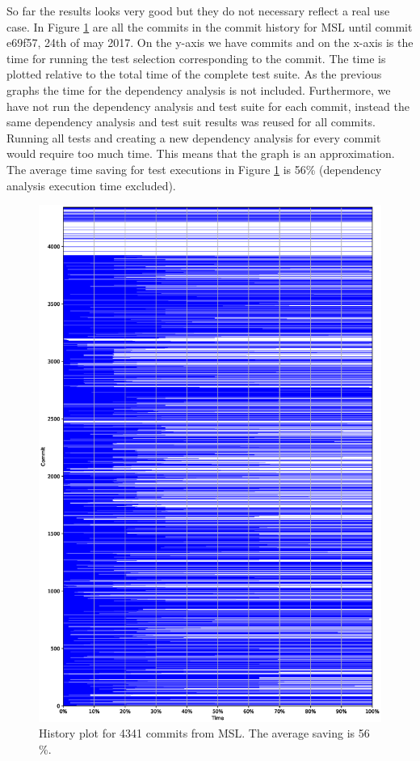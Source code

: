 \documentclass{cslthse-msc}
\begin{document}
So far the results looks very good but they do not necessary reflect a real use case. In Figure \ref{fig:mslhistory} are all the commits in the commit history for MSL until commit e69f57, 24th of may 2017. On the y-axis we have commits and on the x-axis is the time for running the test selection corresponding to the commit. The time is plotted relative to the total time of the complete test suite. As the previous graphs the time for the dependency analysis is not included. Furthermore, we have not run the dependency analysis and test suite for each commit, instead the same dependency analysis and test suit results was reused for all commits. Running all tests and creating a new dependency analysis for every commit would require too much time. This means that the graph is an approximation. The average time saving for test executions in Figure \ref{fig:mslhistory} is 56\% (dependency analysis execution time excluded).

\begin{figure}[!htbp]
    \centering
    \includegraphics[width=\textwidth]{Graphs/MSL_history_plot.eps}
    \caption{History plot for 4341 commits from MSL. The average saving is 56 \%.}
    \label{fig:mslhistory}
\end{figure}
\end{document}
